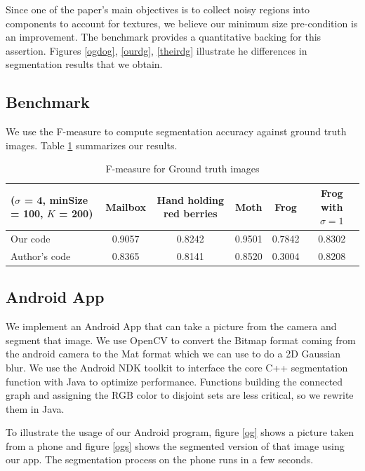 \documentclass[12pt, english, titlepage]{article}
\begin{document}
Since one of the paper's main objectives is to collect noisy regions into components to account for textures, we believe our minimum size pre-condition is an improvement. The benchmark provides a quantitative backing for this assertion. Figures \ref{ogdog}, \ref{ourdg}, \ref{theirdg} illustrate he differences in segmentation results that we obtain.

\subsection{Benchmark}

We use the F-measure to compute segmentation accuracy against ground truth images. Table \ref{bench} summarizes our results.

\begin{table}
\begin{tabular}{|p{3cm}|c|c|c|c|c|}
\hline 
($\sigma$ = 4, minSize = 100, $K$ = 200) & Mailbox & Hand holding red berries & Moth & Frog & Frog with $\sigma=1$\tabularnewline
\hline 
\hline 
Our code & 0.9057 & 0.8242 & 0.9501 & 0.7842 & 0.8302\tabularnewline
\hline 
Author's code & 0.8365 & 0.8141 & 0.8520 & 0.3004 & 0.8208\tabularnewline
\hline
\end{tabular}
\caption{F-measure for Ground truth images}
\label{bench}
\end{table}

\subsection{Android App}

We implement an Android App that can take a picture from the camera and segment that image. We use OpenCV to convert the Bitmap format coming from the android camera to the Mat format which we can use to do a 2D Gaussian blur. We use the Android NDK toolkit to interface the core C++ segmentation function with Java to optimize performance. Functions building the connected graph and assigning the RGB color to disjoint sets are less critical, so we rewrite them in Java.

To illustrate the usage of our Android program, figure \ref{og} shows a picture taken from a phone and figure \ref{ogs} shows the segmented version of that image using our app. The segmentation process on the phone runs in a few seconds.
\end{document}
